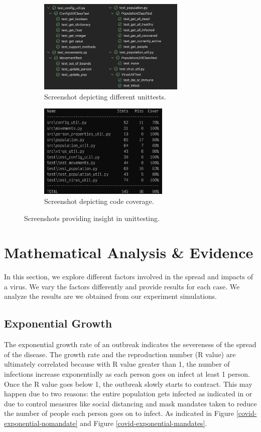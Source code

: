 \documentclass[11pt]{article}
\begin{document}
\begin{figure}[H]
    \centering
    \begin{subfigure}[b]{0.45\textwidth}
        \includegraphics[height=4.5cm]{figures/Tests.png}
        \caption{Screenshot depicting different unittests.}
    \end{subfigure}
    \begin{subfigure}[b]{0.45\textwidth}
        \includegraphics[height=4.5cm]{figures/coverage.png}
        \caption{Screenshot depicting code coverage.}
    \end{subfigure}
    \caption{Screenshots providing insight in unittesting.}
\end{figure}



\section{Mathematical Analysis \& Evidence}

In this section, we explore different factors involved in the spread and impacts of a virus. We vary the factors differently and provide results for each case. We analyze the results are we obtained from our experiment simulations. 

 \subsection{Exponential Growth}
 The exponential growth rate of an outbreak indicates the severeness of the spread of the disease. The growth rate and the reproduction number (R value) are ultimately correlated because with R value greater than 1, the number of infections increase exponentially as each person goes on infect at least 1 person. Once the R value goes below 1, the outbreak slowly starts to contract. This may happen due to two reasons: the entire population gets infected as indicated in  or due to control measures like social distancing and mask mandates taken to reduce the number of people each person goes on to infect. As indicated in Figure \ref{covid-exponential-nomandate} and Figure \ref{covid-exponential-mandates}. 
\end{document}
